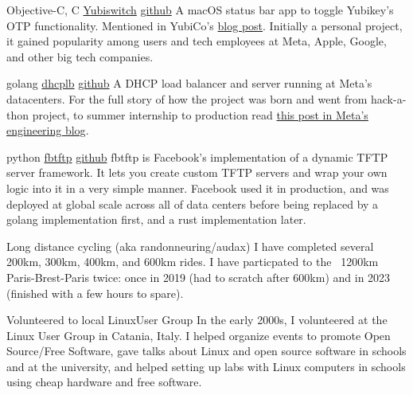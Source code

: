 
\begin{cventries}

  \cventry
  {Objective-C, C}
  {\href{https://github.com/pallotron/yubiswitch}{Yubiswitch}}
  {\href{https://github.com/pallotron/yubiswitch}{github}}
  {}
  {
    A macOS status bar app to toggle Yubikey's OTP functionality.
    Mentioned in YubiCo's \href{https://www.yubico.com/blog/yubiswitch/}{blog post}.
    Initially a personal project, it gained popularity among users and tech employees at Meta, Apple, Google, and other big tech companies.
  }

  \cventry
  {golang}
  {\href{https://github.com/facebookincubator/dhcplb}{dhcplb}}
  {\href{https://github.com/facebookincubator/dhcplb}{github}}
  {}
  {
    A DHCP load balancer and server running at Meta's datacenters.
    For the full story of how the project was born and went from hack-a-thon project, to
    summer internship to production read \href{https://engineering.fb.com/2016/09/13/data-infrastructure/dhcplb-an-open-source-load-balancer/}{this post in Meta's engineering blog}.
  }

  \cventry
  {python}
  {\href{https://github.com/facebookarchive/fbtftp}{fbtftp}}
  {\href{https://github.com/facebookarchive/fbtftp}{github}}
  {}
  {
    fbtftp is Facebook's implementation of a dynamic TFTP server framework. It lets you create custom TFTP servers and wrap your
    own logic into it in a very simple manner. Facebook used it in production, and was deployed at global scale
    across all of data centers before being replaced by a golang implementation first, and a rust implementation later.
  }

\end{cventries}


\begin{cventries}
  \cventry
  {Long distance cycling (aka randonneuring/audax)}
  {}
  {}
  {}
  {
    I have completed several 200km, 300km, 400km, and 600km rides.
    I have particpated to the ~1200km Paris-Brest-Paris twice: once in 2019 (had to scratch after 600km)
    and in 2023 (finished with a few hours to spare).
  }

  \cventry
  {Volunteered to local LinuxUser Group}
  {}
  {}
  {}
  {
    In the early 2000s, I volunteered at the Linux User Group in Catania, Italy.
    I helped organize events to promote Open Source/Free Software, gave talks about Linux and open source software in
    schools and at the university, and helped setting up labs with Linux computers in schools using cheap hardware and free software.
  }
\end{cventries}
